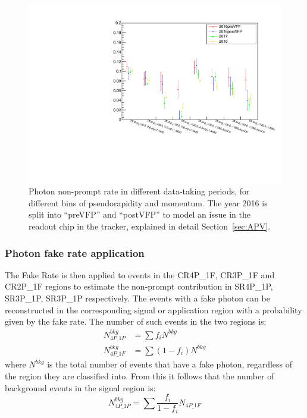 \begin{figure}
\centering
\includegraphics[height=.33\textheight]{Figures/PhFR/FR_VLtoL_pt-aeta_data-ZGToLLG_binEvol.pdf}
\caption{Photon non-prompt rate in different data-taking periods, for different bins of pseudorapidity and momentum.
  The year 2016 is split into ``preVFP'' and ``postVFP'' to model an issue in the readout chip in the tracker, explained in detail Section~\ref{sec:APV}.}
\label{fig:phFR_time}
\end{figure}

\subsubsection{Photon fake rate application}
The Fake Rate is then applied to events in the CR4P\_1F, CR3P\_1F and CR2P\_1F regions to estimate the non-prompt contribution in SR4P\_1P, SR3P\_1P, SR3P\_1P respectively.
The events with a fake photon can be reconstructed in the corresponding signal or application region
with a probability given by the fake rate.
The number of such events in the two regions is:
\begin{equation}
  \begin{split}
    \label{eq:fakeRate_explanation_part1}
    N^{bkg}_{4P\_1P} &= \sum f_i N^{bkg}
    \\
    N^{bkg}_{4P\_1F} &= \sum ( 1-f_i ) N^{bkg}
  \end{split}
\end{equation}
where $N^{bkg}$ is the total number of events that have a fake photon, regardless of the region they are classified into.
From this it follows that the number of background events in the signal region is:
\begin{equation}
  \label{eq:fakeRate_explanation_part2}
  N^{bkg}_{4P\_1P} = \sum \frac{f_i}{1-f_i} N_{4P\_1F}
\end{equation}

